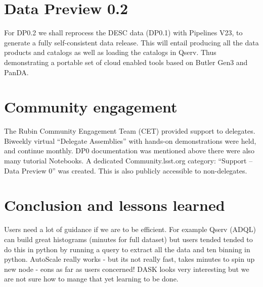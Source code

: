 \section{Data Preview 0.2}
For DP0.2 we shall reprocess the DESC data (DP0.1) with Pipelines V23, to generate a fully self-consistent data release.
This will entail producing all the data products and catalogs as well as loading the  catalogs in Qserv.
Thus demonstrating a portable set of cloud enabled tools based on Butler Gen3 and PanDA.


\section{Community engagement }
The Rubin Community Engagement Team (CET) provided support to delegates.
Biweekly virtual “Delegate Assemblies” with hands-on demonstrations were held, and continue monthly.
DP0 documentation was mentioned above there were also many tutorial Notebooks.
A dedicated Community.lsst.org category: “Support -- Data Preview 0” was created.
This is also publicly accessible to non-delegates.


\section{Conclusion and lessons learned}
Users need a lot of guidance if we are to be efficient.
For example Qserv (ADQL) can build great histograms (minutes for full dataset) but users tended
tended to do this in python by running a query to extract all the data and ten binning in python.
AutoScale really works - but its not really fast, takes minutes to spin up new node - eons as far as users concerned!
DASK looks very interesting but we are not sure how to mange that yet learning to be done.




